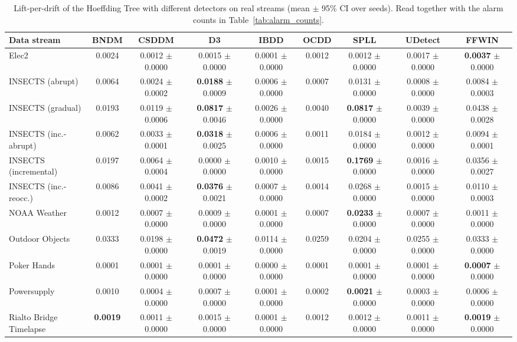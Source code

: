 \begin{table}[!t]
\centering
\caption{Lift-per-drift of the Hoeffding Tree with different detectors on real streams (mean $\pm$ 95\% CI over seeds). Read together with the alarm counts in Table~\ref{tab:alarm_counts}.}
\label{tab:lpd_ffwin}
\footnotesize
\setlength{\tabcolsep}{4pt}
\begin{tabular}{@{}lcccccccc@{}}
\toprule
\textbf{Data stream} & \textbf{BNDM} & \textbf{CSDDM} & \textbf{D3} & \textbf{IBDD} & \textbf{OCDD} & \textbf{SPLL} & \textbf{UDetect} & \textbf{FFWIN} \\
\midrule
Elec2 & 0.0024 & 0.0012 $\pm$ 0.0000 & 0.0015 $\pm$ 0.0000 & 0.0001 $\pm$ 0.0000 & 0.0012 & 0.0012 $\pm$ 0.0000 & 0.0017 $\pm$ 0.0000 & \textbf{0.0037} $\pm$ 0.0000 \\
INSECTS (abrupt) & 0.0064 & 0.0024 $\pm$ 0.0002 & \textbf{0.0188} $\pm$ 0.0009 & 0.0006 $\pm$ 0.0000 & 0.0007 & 0.0131 $\pm$ 0.0000 & 0.0008 $\pm$ 0.0000 & 0.0084 $\pm$ 0.0003 \\
INSECTS (gradual) & 0.0193 & 0.0119 $\pm$ 0.0006 & \textbf{0.0817} $\pm$ 0.0046 & 0.0026 $\pm$ 0.0000 & 0.0040 & \textbf{0.0817} $\pm$ 0.0000 & 0.0039 $\pm$ 0.0000 & 0.0438 $\pm$ 0.0028 \\
INSECTS (inc.-abrupt) & 0.0062 & 0.0033 $\pm$ 0.0001 & \textbf{0.0318} $\pm$ 0.0025 & 0.0006 $\pm$ 0.0000 & 0.0011 & 0.0184 $\pm$ 0.0000 & 0.0012 $\pm$ 0.0000 & 0.0094 $\pm$ 0.0001 \\
INSECTS (incremental) & 0.0197 & 0.0064 $\pm$ 0.0004 & 0.0000 $\pm$ 0.0000 & 0.0010 $\pm$ 0.0000 & 0.0015 & \textbf{0.1769} $\pm$ 0.0000 & 0.0016 $\pm$ 0.0000 & 0.0356 $\pm$ 0.0027 \\
INSECTS (inc.-reocc.) & 0.0086 & 0.0041 $\pm$ 0.0002 & \textbf{0.0376} $\pm$ 0.0021 & 0.0007 $\pm$ 0.0000 & 0.0014 & 0.0268 $\pm$ 0.0000 & 0.0015 $\pm$ 0.0000 & 0.0110 $\pm$ 0.0003 \\
NOAA Weather & 0.0012 & 0.0007 $\pm$ 0.0000 & 0.0009 $\pm$ 0.0000 & 0.0001 $\pm$ 0.0000 & 0.0007 & \textbf{0.0233} $\pm$ 0.0000 & 0.0007 $\pm$ 0.0000 & 0.0011 $\pm$ 0.0000 \\
Outdoor Objects & 0.0333 & 0.0198 $\pm$ 0.0000 & \textbf{0.0472} $\pm$ 0.0019 & 0.0114 $\pm$ 0.0000 & 0.0259 & 0.0204 $\pm$ 0.0000 & 0.0255 $\pm$ 0.0000 & 0.0333 $\pm$ 0.0000 \\
Poker Hands & 0.0001 & 0.0001 $\pm$ 0.0000 & 0.0001 $\pm$ 0.0000 & 0.0000 $\pm$ 0.0000 & 0.0001 & 0.0001 $\pm$ 0.0000 & 0.0001 $\pm$ 0.0000 & \textbf{0.0007} $\pm$ 0.0000 \\
Powersupply & 0.0010 & 0.0004 $\pm$ 0.0000 & 0.0007 $\pm$ 0.0000 & 0.0001 $\pm$ 0.0000 & 0.0002 & \textbf{0.0021} $\pm$ 0.0000 & 0.0003 $\pm$ 0.0000 & 0.0006 $\pm$ 0.0000 \\
Rialto Bridge Timelapse & \textbf{0.0019} & 0.0011 $\pm$ 0.0000 & 0.0015 $\pm$ 0.0000 & 0.0001 $\pm$ 0.0000 & 0.0012 & 0.0012 $\pm$ 0.0000 & 0.0011 $\pm$ 0.0000 & \textbf{0.0019} $\pm$ 0.0000 \\
\bottomrule
\end{tabular}
\end{table}
